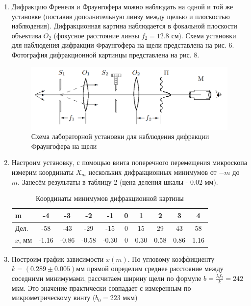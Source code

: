 \documentclass[a4paper]{article}
\begin{document}
\begin{enumerate}
    \item Дифракцию Френеля и Фраунгофера можно наблюдать на одной и той же установке (поставив дополнительную линзу между щелью и плоскостью наблюдения). Дифракционная картина наблюдается в фокальной плоскости объектива $O_2$ (фокусное расстояние линзы $f_2 = 12.8$ см). Схема установки для наблюдения дифракции Фраунгофера на щели представлена на рис. 6. Фотография дифракционной картинцы представлена на рис. 8.
    
  \begin{figure}[h]
    \centering
    \includegraphics[width=12cm]{setup_fraunhofer.PNG}
    \caption{Схема лабораторной установки для наблюдения дифракции Фраунгофера на щели}
    \label{fig:fraun}
\end{figure}  
    
    \item Настроим установку, с помощью винта поперечного перемещения микроскопа измерим координаты $X_m$ нескольких дифракционных минимумов от $-m$ до $m$. Занесём результаты в таблицу 2 (цена деления шкалы - 0.02 мм). 
    
    \begin{table}[h]
    \centering
    \begin{center}
    \caption{Координаты минимумов дифракционной картины}
    \end{center}
    \vspace{0.1cm}
    \label{tab:fraun}
    \begin{tabular}{|l|c|c|c|c|c|c|c|c|c|}
 \hline
m & -4 & -3 & -2 & -1 & 0 & 1 & 2 & 3 & 4 \\
 \hline
 Дел. & -58 & -43 & -29 & -15 & 0 & 15 & 29 & 43 & 58 \\
 $x$, мм & -1.16 & -0.86 & -0.58 & -0.30 & 0 & 0.30 & 0.58 & 0.86 & 1.16 \\

 \hline
 
\end{tabular}
\end{table}

\item Построим график зависимости $x(m)$. По угловому коэффициенту $k = (0.289 \pm 0.005)$мм прямой определим среднее расстояние между соседними минимумами, рассчитаем ширину щели по формуле $b = \frac{\lambda f_2}{k} = 242$ мкм. Это значение практически совпадает с измеренным по микрометрическому винту ($b_0 = 223$ мкм)


\end{enumerate}
\end{document}
